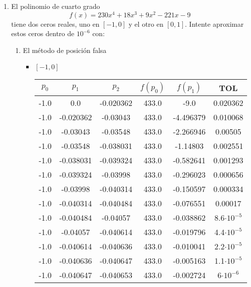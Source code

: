 \documentclass[12pt]{article}
\begin{document}
\begin{enumerate}
    \item El polinomio de cuarto grado
    \[
        f(x) = 230x^4 + 18x^3 + 9x^2 - 221x - 9
    \]
    tiene dos ceros reales, uno en \([-1, 0]\) y el otro en \([0, 1]\). Intente aproximar estos ceros dentro de \(10^{-6}\) con:
    \begin{enumerate}
        \item El método de posición falsa
        \begin{itemize}
            \item \([-1, 0]\)
            \begin{center}
            \begin{tabular}{|c|c|c|c|c|c|}
            \hline
            \(p_0\) & \(p_1\)& \(p_2\)&\(f(p_0)\) & \(f(p_1)\) & \textbf{TOL} \\
            \hline
            -1.0 & 0.0 & -0.020362 & 433.0 & -9.0 &  0.020362 \\
            -1.0 & -0.020362 & -0.03043 & 433.0 & -4.496379 &  0.010068 \\
            -1.0 & -0.03043 & -0.03548 & 433.0 & -2.266946 &  0.00505 \\
            -1.0 & -0.03548 & -0.038031 & 433.0 & -1.14803 &  0.002551 \\
            -1.0 & -0.038031 & -0.039324 & 433.0 & -0.582641 &  0.001293 \\
            -1.0 & -0.039324 & -0.03998 & 433.0 & -0.296023 &  0.000656 \\
            -1.0 & -0.03998 & -0.040314 & 433.0 & -0.150597 &  0.000334 \\
            -1.0 & -0.040314 & -0.040484 & 433.0 & -0.076551 &  0.00017 \\
            -1.0 & -0.040484 & -0.04057 & 433.0 & -0.038862 &  8.6\(\cdot 10^{-5}\) \\
            -1.0 & -0.04057 & -0.040614 & 433.0 & -0.019796 &  4.4\(\cdot 10^{-5}\) \\
            -1.0 & -0.040614 & -0.040636 & 433.0 & -0.010041 &  2.2\(\cdot 10^{-5}\) \\
            -1.0 & -0.040636 & -0.040647 & 433.0 & -0.005163 &  1.1\(\cdot 10^{-5}\) \\
            -1.0 & -0.040647 & -0.040653 & 433.0 & -0.002724 &  6\(\cdot 10^{-6}\) \\
            \hline 
            \end{tabular}
            \end{center}
            

\end{itemize}
\end{enumerate}
\end{enumerate}
\end{document}
